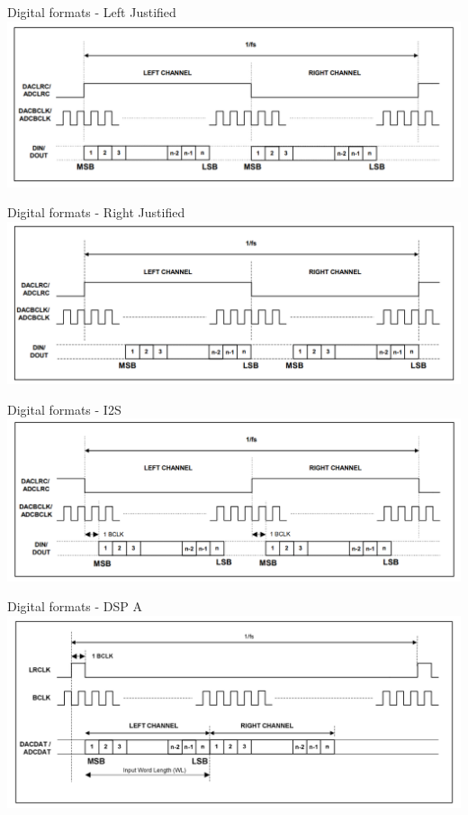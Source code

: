 \begin{frame}{Digital formats - Left Justified}
    \includegraphics[width=\textwidth]{slides/audio-hardware/LJ.png}\\
\end{frame}

\begin{frame}{Digital formats - Right Justified}
    \includegraphics[width=\textwidth]{slides/audio-hardware/RJ.png}\\
\end{frame}

\begin{frame}{Digital formats - I2S}
    \includegraphics[width=\textwidth]{slides/audio-hardware/I2S.png}\\
\end{frame}

\begin{frame}{Digital formats - DSP A}
    \includegraphics[width=\textwidth]{slides/audio-hardware/DSP_A.png}\\
\end{frame}


